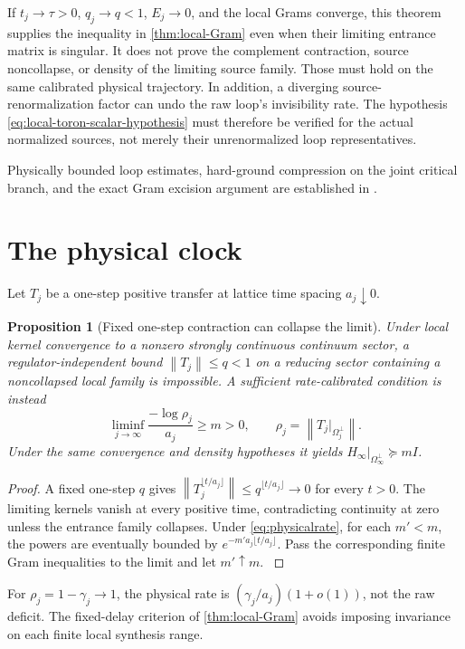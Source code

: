 \documentclass[11pt,oneside,openany]{book}
\newtheorem{proposition}[proposition]{Proposition}
\theoremstyle{definition}
\theoremstyle{remark}
\newcommand{\norm}[1]{\left\lVert#1\right\rVert}
\newcommand{\src}[2]{\cite[#2]{#1}}
\newcommand{\sourcebasis}[1]{\par\smallskip\noindent #1\par}
\begin{document}
If $t_j\to\tau>0$, $q_j\to q<1$, $E_j\to0$, and the local
Grams converge, this theorem supplies the inequality in
\cref{thm:local-Gram} even when their limiting entrance matrix is
singular. It does not prove the complement contraction, source
noncollapse, or density of the limiting source family. Those must
hold on the same calibrated physical trajectory. In addition, a
diverging source-renormalization factor can undo the raw loop's
invisibility rate. The hypothesis
\cref{eq:local-toron-scalar-hypothesis} must therefore be verified
for the actual normalized sources, not merely their unrenormalized
loop representatives.
\sourcebasis{Physically bounded loop estimates, hard-ground
compression on the joint critical branch, and the exact Gram
excision argument are established in \src{F16B}{V56}.}


\section{The physical clock}
Let $T_j$ be a one-step positive transfer at lattice time spacing $a_j\downarrow0$.

\begin{proposition}[Fixed one-step contraction can collapse the limit]\label{prop:step-collapse}
Under local kernel convergence to a nonzero strongly continuous continuum sector, a regulator-independent bound $\norm{T_j}\le q<1$ on a reducing sector containing a noncollapsed local family is impossible. A sufficient rate-calibrated condition is instead
\begin{equation}\label{eq:physicalrate}
\liminf_{j\to\infty}\frac{-\log\rho_j}{a_j}\ge m>0,
\qquad \rho_j=\norm{T_j|_{\Omega_j^\perp}}.
\end{equation}
Under the same convergence and density hypotheses it yields $H_\infty|_{\Omega_\infty^\perp}\succeq mI$.
\end{proposition}
\begin{proof}
A fixed one-step $q$ gives $\norm{T_j^{\lfloor t/a_j\rfloor}}\le q^{\lfloor t/a_j\rfloor}\to0$ for every $t>0$. The limiting kernels vanish at every positive time, contradicting continuity at zero unless the entrance family collapses. Under \cref{eq:physicalrate}, for each $m'<m$, the powers are eventually bounded by $e^{-m'a_j\lfloor t/a_j\rfloor}$. Pass the corresponding finite Gram inequalities to the limit and let $m'\uparrow m$. \src{F1}{V1}
\end{proof}

For $\rho_j=1-\gamma_j\to1$, the physical rate is $(\gamma_j/a_j)(1+o(1))$, not the raw deficit. The fixed-delay criterion of \cref{thm:local-Gram} avoids imposing invariance on each finite local synthesis range.
\end{document}
